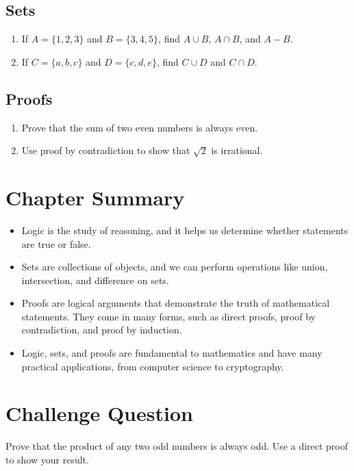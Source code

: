 \subsection{Sets}
\begin{enumerate}
    \item If \( A = \{1, 2, 3\} \) and \( B = \{3, 4, 5\} \), find \( A \cup B \), \( A \cap B \), and \( A - B \).
    \item If \( C = \{a, b, c\} \) and \( D = \{c, d, e\} \), find \( C \cup D \) and \( C \cap D \).
\end{enumerate}

\subsection{Proofs}
\begin{enumerate}
    \item Prove that the sum of two even numbers is always even.
    \item Use proof by contradiction to show that \( \sqrt{2} \) is irrational.
\end{enumerate}

\section{Chapter Summary}
\begin{itemize}
    \item Logic is the study of reasoning, and it helps us determine whether statements are true or false.
    \item Sets are collections of objects, and we can perform operations like union, intersection, and difference on sets.
    \item Proofs are logical arguments that demonstrate the truth of mathematical statements. They come in many forms, such as direct proofs, proof by contradiction, and proof by induction.
    \item Logic, sets, and proofs are fundamental to mathematics and have many practical applications, from computer science to cryptography.
\end{itemize}

\section*{Challenge Question}
Prove that the product of any two odd numbers is always odd. Use a direct proof to show your result.